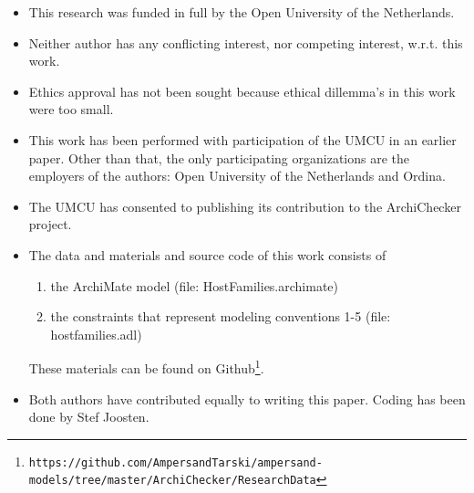 \documentclass[sn-vancouver]{sn-jnl}%
\theoremstyle{thmstyleone}%
\theoremstyle{thmstyletwo}%
\theoremstyle{thmstylethree}%
\begin{document}
\begin{itemize}
\item This research was funded in full by the Open University of the Netherlands.
\item Neither author has any conflicting interest, nor competing interest, w.r.t. this work.
\item Ethics approval has not been sought because ethical dillemma's in this work were too small.
\item This work has been performed with participation of the UMCU in an earlier paper.
Other than that, the only participating organizations are the employers of the authors: Open University of the Netherlands and Ordina.
\item The UMCU has consented to publishing its contribution to the ArchiChecker project.
\item The data and materials and source code of this work consists of
\begin{enumerate}
   \item the ArchiMate model (file: HostFamilies.archimate)
   \item the constraints that represent modeling conventions 1-5 (file: hostfamilies.adl)
\end{enumerate}
These materials can be found on Github\footnote{\tt\tiny https://github.com/AmpersandTarski/ampersand-models/tree/master/ArchiChecker/ResearchData}.
\item Both authors have contributed equally to writing this paper. Coding has been done by Stef Joosten.
\end{itemize}









\end{document}
